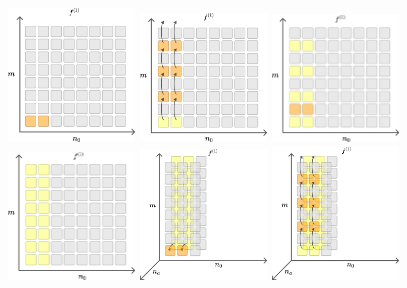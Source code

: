 \documentclass{pracalicmgr}
\begin{document}
\begin{figure}[H]
    \center
    \includegraphics[width=0.30\textwidth]{uno.pdf}
    \includegraphics[width=0.30\textwidth]{dos.pdf}
    \includegraphics[width=0.30\textwidth]{tres.pdf}
    \includegraphics[width=0.30\textwidth]{quatro.pdf}
    \includegraphics[width=0.30\textwidth]{cinco.pdf}
    \includegraphics[width=0.30\textwidth]{seis.pdf}

\end{figure}
\end{document}
